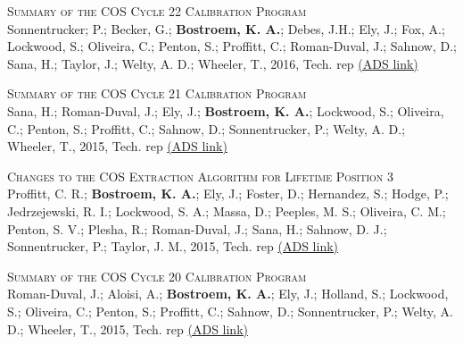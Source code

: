 \vspace{-0.1in}   
\begin{revnumerate}[24]
\item{\textsc{Summary of the COS Cycle 22 Calibration Program}\\
Sonnentrucker; P.; Becker, G.; {\bf Bostroem, K. A.}; Debes, J.H.; Ely, J.; Fox, A.; Lockwood, S.; Oliveira, C.; Penton, S.; Proffitt, C.; Roman-Duval, J.; Sahnow, D.; Sana, H.; Taylor, J.; Welty, A. D.; Wheeler, T., 2016, Tech. rep 
\color{blue}\href{https://ui.adsabs.harvard.edu/#abs/2016cos..rept....3S/abstract}{(ADS link)}\color{black}}\\ %
\item{\textsc{Summary of the COS Cycle 21 Calibration Program}\\
Sana, H.; Roman-Duval, J.; Ely, J.; {\bf Bostroem, K. A.}; Lockwood, S.; Oliveira, C.; Penton, S.; Proffitt, C.; Sahnow, D.; Sonnentrucker, P.; Welty, A. D.; Wheeler, T., 2015, Tech. rep 
\color{blue}\href{https://ui.adsabs.harvard.edu/#abs/2015cos..rept....6S/abstract}{(ADS link)}\color{black}}\\ %

\item{\textsc{Changes to the COS Extraction Algorithm for Lifetime Position 3}\\
Proffitt, C. R.; {\bf Bostroem, K. A.}; Ely, J.; Foster, D.; Hernandez, S.; Hodge, P.; Jedrzejewski, R. I.; Lockwood, S. A.; Massa, D.; Peeples, M. S.; Oliveira, C. M.; Penton, S. V.; Plesha, R.; Roman-Duval, J.; Sana, H.; Sahnow, D. J.; Sonnentrucker, P.; Taylor, J. M.,  2015, Tech. rep 
\color{blue}\href{https://ui.adsabs.harvard.edu/#abs/2015cos..rept....3P/abstract}{(ADS link)}\color{black}}\\ %

\item{\textsc{Summary of the COS Cycle 20 Calibration Program}\\
Roman-Duval, J.; Aloisi, A.; {\bf Bostroem, K. A.}; Ely, J.; Holland, S.; Lockwood, S.; Oliveira, C.; Penton, S.; Proffitt, C.; Sahnow, D.; Sonnentrucker, P.; Welty, A. D.; Wheeler, T., 2015, Tech. rep 
\color{blue}\href{https://ui.adsabs.harvard.edu/#abs/2015cos..rept....2R/abstract}{(ADS link)}\color{black}}\\ %


\end{revnumerate}
